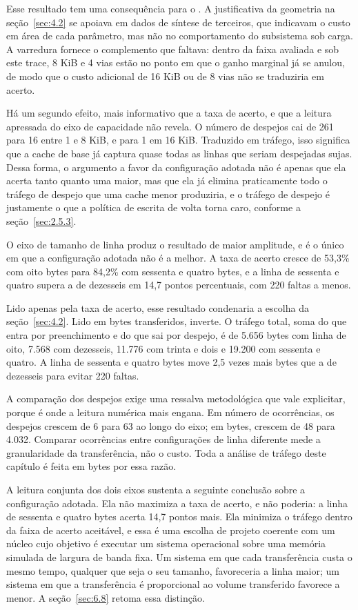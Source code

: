 Esse resultado tem uma consequência para o . A justificativa da geometria na seção~\ref{sec:4.2} se apoiava em dados de síntese de terceiros, que indicavam o custo em área de cada parâmetro, mas não no comportamento do subsistema sob carga. A varredura fornece o complemento que faltava: dentro da faixa avaliada e sob este trace, 8 KiB e 4 vias estão no ponto em que o ganho marginal já se anulou, de modo que o custo adicional de 16 KiB ou de 8 vias não se traduziria em acerto.

Há um segundo efeito, mais informativo que a taxa de acerto, e que a leitura apressada do eixo de capacidade não revela. O número de despejos cai de 261 para 16 entre 1 e 8 KiB, e para 1 em 16 KiB. Traduzido em tráfego, isso significa que a cache de base já captura quase todas as linhas que seriam despejadas sujas. Dessa forma, o argumento a favor da configuração adotada não é apenas que ela acerta tanto quanto uma maior, mas que ela já elimina praticamente todo o tráfego de despejo que uma cache menor produziria, e o tráfego de despejo é justamente o que a política de escrita de volta torna caro, conforme a seção~\ref{sec:2.5.3}.

O eixo de tamanho de linha produz o resultado de maior amplitude, e é o único em que a configuração adotada não é a melhor. A taxa de acerto cresce de 53,3\% com oito bytes para 84,2\% com sessenta e quatro bytes, e a linha de sessenta e quatro supera a de dezesseis em 14,7 pontos percentuais, com 220 faltas a menos.

Lido apenas pela taxa de acerto, esse resultado condenaria a escolha da seção~\ref{sec:4.2}. Lido em bytes transferidos, inverte. O tráfego total, soma do que entra por preenchimento e do que sai por despejo, é de 5.656 bytes com linha de oito, 7.568 com dezesseis, 11.776 com trinta e dois e 19.200 com sessenta e quatro. A linha de sessenta e quatro bytes move 2,5 vezes mais bytes que a de dezesseis para evitar 220 faltas.

A comparação dos despejos exige uma ressalva metodológica que vale explicitar, porque é onde a leitura numérica mais engana. Em número de ocorrências, os despejos crescem de 6 para 63 ao longo do eixo; em bytes, crescem de 48 para 4.032. Comparar ocorrências entre configurações de linha diferente mede a granularidade da transferência, não o custo. Toda a análise de tráfego deste capítulo é feita em bytes por essa razão.

A leitura conjunta dos dois eixos sustenta a seguinte conclusão sobre a configuração adotada. Ela não maximiza a taxa de acerto, e não poderia: a linha de sessenta e quatro bytes acerta 14,7 pontos mais. Ela minimiza o tráfego dentro da faixa de acerto aceitável, e essa é uma escolha de projeto coerente com um núcleo cujo objetivo é executar um sistema operacional sobre uma memória simulada de largura de banda fixa. Um sistema em que cada transferência custa o mesmo tempo, qualquer que seja o seu tamanho, favoreceria a linha maior; um sistema em que a transferência é proporcional ao volume transferido favorece a menor. A seção~\ref{sec:6.8} retoma essa distinção.


